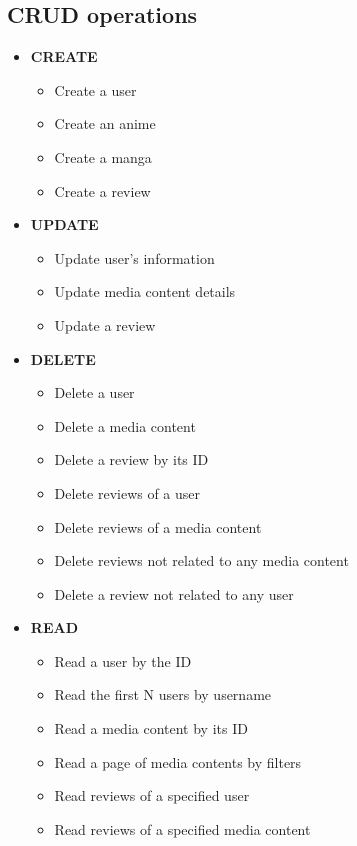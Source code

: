 \subsection*{CRUD operations}
\begin{itemize}
  \item \textbf{CREATE}
  \begin{itemize}
      \item Create a user
      \item Create an anime
      \item Create a manga
      \item Create a review
  \end{itemize}

  \item \textbf{UPDATE}
  \begin{itemize}
      \item Update user's information
      \item Update media content details
      \item Update a review
  \end{itemize}

  \item \textbf{DELETE}
  \begin{itemize}
      \item Delete a user
      \item Delete a media content
      \item Delete a review by its ID
      \item Delete reviews of a user
      \item Delete reviews of a media content
      \item Delete reviews not related to any media content
      \item Delete a review not related to any user
  \end{itemize}

  \item \textbf{READ}
  \begin{itemize}
      \item Read a user by the ID
      \item Read the first N users by username
      \item Read a media content by its ID
      \item Read a page of media contents by filters
      \item Read reviews of a specified user
      \item Read reviews of a specified media content
  \end{itemize}
\end{itemize}

